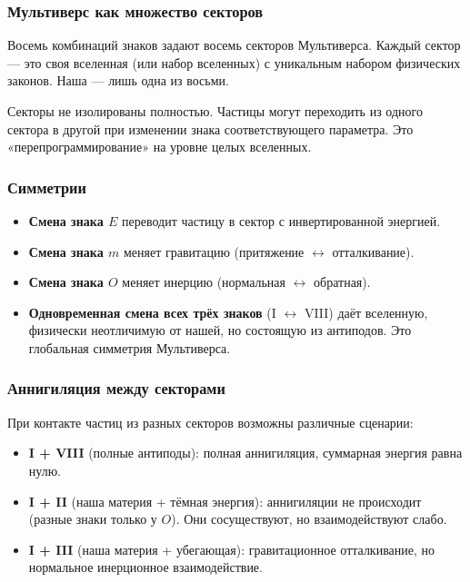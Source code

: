 \documentclass[12pt,a4paper]{article}
\begin{document}
\subsubsection{Мультиверс как множество секторов}
Восемь комбинаций знаков задают восемь секторов Мультиверса. Каждый сектор --- это своя вселенная (или набор вселенных) с уникальным набором физических законов. Наша --- лишь одна из восьми.

Секторы не изолированы полностью. Частицы могут переходить из одного сектора в другой при изменении знака соответствующего параметра. Это «перепрограммирование» на уровне целых вселенных.

\subsubsection{Симметрии}
\begin{itemize}
    \item \textbf{Смена знака $E$} переводит частицу в сектор с инвертированной энергией.
    \item \textbf{Смена знака $m$} меняет гравитацию (притяжение $\leftrightarrow$ отталкивание).
    \item \textbf{Смена знака $O$} меняет инерцию (нормальная $\leftrightarrow$ обратная).
    \item \textbf{Одновременная смена всех трёх знаков} (I $\leftrightarrow$ VIII) даёт вселенную, физически неотличимую от нашей, но состоящую из антиподов. Это глобальная симметрия Мультиверса.
\end{itemize}

\subsubsection{Аннигиляция между секторами}
При контакте частиц из разных секторов возможны различные сценарии:
\begin{itemize}
    \item \textbf{I + VIII} (полные антиподы): полная аннигиляция, суммарная энергия равна нулю.
    \item \textbf{I + II} (наша материя + тёмная энергия): аннигиляции не происходит (разные знаки только у $O$). Они сосуществуют, но взаимодействуют слабо.
    \item \textbf{I + III} (наша материя + убегающая): гравитационное отталкивание, но нормальное инерционное взаимодействие.
\end{itemize}
\end{document}
